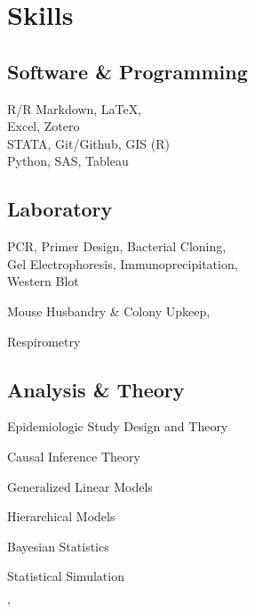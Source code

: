 \section{Skills}
\begin{center}
\begin{minipage}[t]{0.26\textwidth}
\raggedright
\subsection{Software \& Programming}
R/R Markdown, \LaTeX, \\
Excel, Zotero\\
STATA, Git/Github, GIS (R)\\
Python, SAS, Tableau\\
\end{minipage}
\begin{minipage}[t]{0.36\textwidth}
\raggedright
\subsection{Laboratory}
 PCR, Primer Design, Bacterial Cloning, \\
Gel Electrophoresis, Immunoprecipitation, \\
Western Blot \par
{} 
Mouse Husbandry \& Colony Upkeep, \par Respirometry
\end{minipage}
\begin{minipage}[t]{0.36\textwidth}
\raggedright
\subsection{Analysis \& Theory}
\begin{tightemize}
\setlength{\itemindent}{-.2in}
\vspace{0.7em}
\item Epidemiologic Study Design and Theory
\item Causal Inference Theory
\item Generalized Linear Models
\item Hierarchical Models
\item Bayesian Statistics
\item Statistical Simulation
\end{tightemize}
\end{minipage}'

\begin{comment}
\begin{minipage}[t]{0.12\textwidth}
\raggedright
\subsection{Languages}
\location{Native fluency:} English, \par Mandarin Chinese
\end{minipage}
\end{comment}

\end{center}
\sectionsep